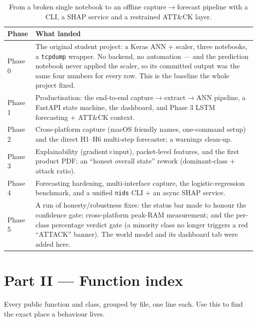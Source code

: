\documentclass[11pt,a4paper]{article}
\begin{document}
\begin{table}[H]\centering\small
\begin{tabular}{@{}p{2.3cm}p{12.5cm}@{}}
\toprule
\textbf{Phase} & \textbf{What landed} \\ \midrule
Phase 0 & The original student project: a Keras ANN + scaler, three notebooks, a
  \texttt{tcpdump} wrapper. No backend, no automation --- and the prediction
  notebook never applied the scaler, so its committed output was the same four
  numbers for every row. This is the baseline the whole project fixed. \\
Phase 1 & Productisation: the end-to-end capture$\to$extract$\to$ANN pipeline, a
  FastAPI state machine, the dashboard, and Phase 3 LSTM forecasting +
  ATT\&CK context. \\
Phase 2 & Cross-platform capture (macOS friendly names, one-command setup) and
  the direct H1--H6 multi-step forecaster; a warnings clean-up. \\
Phase 3 & Explainability (gradient$\times$input), packet-level features, and the
  first product PDF; an ``honest overall state'' rework
  (dominant-class + attack ratio). \\
Phase 4 & Forecasting hardening, multi-interface capture, the logistic-regression
  benchmark, and a unified \texttt{nids} CLI + an async SHAP service. \\
Phase 5 & A run of honesty/robustness fixes: the status bar made to honour the
  confidence gate; cross-platform peak-RAM measurement; and the per-class
  percentage verdict gate (a minority class no longer triggers a red ``ATTACK''
  banner). The world model and its dashboard tab were added here. \\
\bottomrule
\end{tabular}
\caption{From a broken single notebook to an offline capture$\to$forecast
pipeline with a CLI, a SHAP service and a restrained ATT\&CK layer.}
\end{table}

\clearpage
\part*{Part II --- Function index}

Every public function and class, grouped by file, one line each. Use this to
find the exact place a behaviour lives.

\newcommand{\fnrow}[3]{\texttt{#1} & \texttt{#2} & #3 \\}
\newenvironment{fntable}[1]{%
  \subsection*{#1}
  \begin{longtable}{@{}p{4.4cm}p{2.7cm}p{7.2cm}@{}}
  \toprule \textbf{Name} & \textbf{Location} & \textbf{What it does} \\ \midrule
  \endfirsthead
  \toprule \textbf{Name} & \textbf{Location} & \textbf{What it does} \\ \midrule
  \endhead
  \bottomrule \endfoot
}{\end{longtable}}
\end{document}
